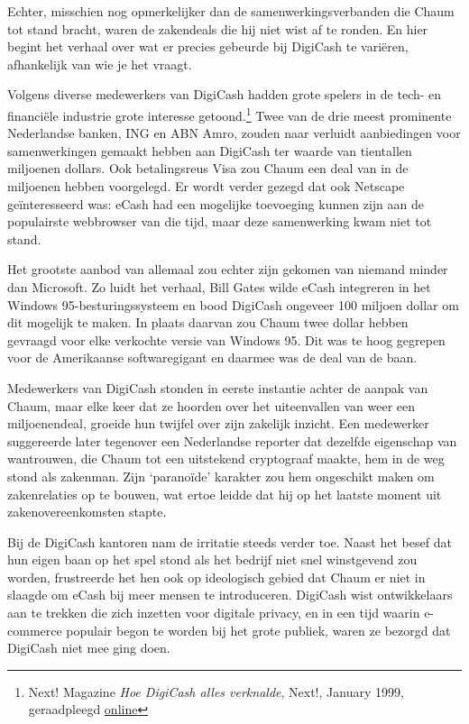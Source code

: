 \documentclass[
  a5paper,
  smalldemyvopaper,11pt,twoside,onecolumn,openright,extrafontsizes,
hidelinks]{memoir}
\begin{document}
Echter, misschien nog opmerkelijker dan de samenwerkingsverbanden die
Chaum tot stand bracht, waren de zakendeals die hij niet wist af te
ronden. En hier begint het verhaal over wat er precies gebeurde bij
DigiCash te variëren, afhankelijk van wie je het vraagt.

Volgens diverse medewerkers van DigiCash hadden grote spelers in de
tech- en financiële industrie grote interesse getoond.\footnote{Next!
  Magazine \emph{Hoe DigiCash alles verknalde}, Next!, January 1999,
  geraadpleegd
  \href{https://web.archive.org/web/19990427142412/https://www.nextmagazine.nl/ecash.htm}{online}}
Twee van de drie meest prominente Nederlandse banken, ING en ABN Amro,
zouden naar verluidt aanbiedingen voor samenwerkingen gemaakt hebben aan
DigiCash ter waarde van tientallen miljoenen dollars. Ook betalingsreus
Visa zou Chaum een deal van in de miljoenen hebben voorgelegd. Er wordt
verder gezegd dat ook Netscape geïnteresseerd was: eCash had een
mogelijke toevoeging kunnen zijn aan de populairste webbrowser van die
tijd, maar deze samenwerking kwam niet tot stand.

Het grootste aanbod van allemaal zou echter zijn gekomen van niemand
minder dan Microsoft. Zo luidt het verhaal, Bill Gates wilde eCash
integreren in het Windows 95-besturingssysteem en bood DigiCash ongeveer
100 miljoen dollar om dit mogelijk te maken. In plaats daarvan zou Chaum
twee dollar hebben gevraagd voor elke verkochte versie van Windows 95.
Dit was te hoog gegrepen voor de Amerikaanse softwaregigant en daarmee
was de deal van de baan.

Medewerkers van DigiCash stonden in eerste instantie achter de aanpak
van Chaum, maar elke keer dat ze hoorden over het uiteenvallen van weer
een miljoenendeal, groeide hun twijfel over zijn zakelijk inzicht. Een
medewerker suggereerde later tegenover een Nederlandse reporter dat
dezelfde eigenschap van wantrouwen, die Chaum tot een uitstekend
cryptograaf maakte, hem in de weg stond als zakenman. Zijn `paranoïde'
karakter zou hem ongeschikt maken om zakenrelaties op te bouwen, wat
ertoe leidde dat hij op het laatste moment uit zakenovereenkomsten
stapte.

Bij de DigiCash kantoren nam de irritatie steeds verder toe. Naast het
besef dat hun eigen baan op het spel stond als het bedrijf niet snel
winstgevend zou worden, frustreerde het hen ook op ideologisch gebied
dat Chaum er niet in slaagde om eCash bij meer mensen te introduceren.
DigiCash wist ontwikkelaars aan te trekken die zich inzetten voor
digitale privacy, en in een tijd waarin e-commerce populair begon te
worden bij het grote publiek, waren ze bezorgd dat DigiCash niet mee
ging doen.
\end{document}
